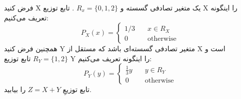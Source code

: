 فرض کنید X یک متغیر تصادفی گسسته و 
$ R_x = \{ 0, 1, 2 \} $
. تابع توزیع X را اینگونه تعریف می‌کنیم:
$$
P_X(x) = 
\begin{cases}
1/3 &\quad x \in R_X \\
0 & \quad \text{otherwise}
\end{cases}
$$
همچنین فرض کنید Y متغیر تصادفی گسسته‌ای باشد که مستقل از X است و 
$
R_Y = \{1 , 2\}
$
تابع توزیع Y را اینگونه تعریف می‌کنیم:
$$
P_Y(y) = 
\begin{cases}
\frac{1}{3}y &\quad y \in R_Y \\
0 &\quad \text{otherwise}
\end{cases}
$$
تابع توزیعِ 
$ Z = X + Y $
را بیابید.